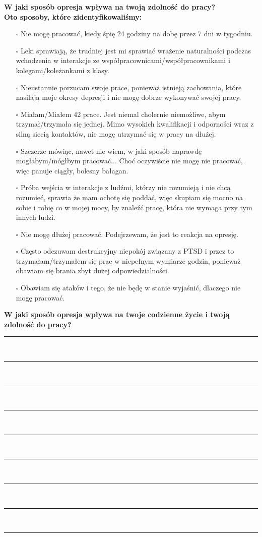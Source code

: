 \noindent\textcolor{ProcessBlue}{\textbf{\Large{W jaki sposób opresja wpływa na twoją zdolność do pracy?}}}\\
\textbf{\large{Oto sposoby, które zidentyfikowaliśmy:}}
\begin{multicols}{2}
\begin{itemize}
\item[$\square$]{Nie mogę pracować, kiedy śpię 24 godziny na dobę przez 7 dni w tygodniu.}
\item[$\square$]{Leki sprawiają, że trudniej jest mi sprawiać wrażenie naturalności podczas wchodzenia w interakcje ze współpracownicami/współpracownikami i kolegami/koleżankami z klasy.}
\item[$\square$]{Nieustannie porzucam swoje prace, ponieważ istnieją zachowania, które nasilają moje okresy depresji i nie mogę dobrze wykonywać swojej pracy.}
\item[$\square$]{Miałam/Miałem 42 prace. Jest niemal cholernie niemożliwe, abym trzymał/trzymała się jednej. Mimo wysokich kwalifikacji i odporności wraz z silną siecią kontaktów, nie mogę utrzymać się w pracy na dłużej.}
\item[$\square$]{Szczerze mówiąc, nawet nie wiem, w jaki sposób naprawdę mogłabym/mógłbym pracować... Choć oczywiście nie mogę nie pracować, więc panuje ciągły, bolesny bałagan.}
\item[$\square$]{Próba wejścia w interakcje z ludźmi, którzy nie rozumieją i nie chcą rozumieć, sprawia że mam ochotę się poddać, więc skupiam się mocno na sobie i robię co w mojej mocy, by znaleźć pracę, która nie wymaga przy tym innych ludzi.}
\item[$\square$]{Nie mogę dłużej pracować. Podejrzewam, że jest to reakcja na opresję.}
\item[$\square$]{Często odczuwam destrukcyjny niepokój związany z PTSD i przez to trzymałam/trzymałem się prac w niepełnym wymiarze godzin, ponieważ obawiam się brania zbyt dużej odpowiedzialności.}
\item[$\square$]{Obawiam się ataków i tego, że nie będę w stanie wyjaśnić, dlaczego nie mogę pracować.}
\end{itemize}
\end{multicols}


\newpage
\noindent
\textcolor{ProcessBlue}{\textbf{\Large{W jaki sposób opresja wpływa na twoje codzienne życie i twoją zdolność do pracy?}}}\\
\noindent\rule{\textwidth}{1pt}\\
\noindent\rule{\textwidth}{1pt}\\
\noindent\rule{\textwidth}{1pt}\\
\noindent\rule{\textwidth}{1pt}\\
\noindent\rule{\textwidth}{1pt}\\
\noindent\rule{\textwidth}{1pt}\\
\noindent\rule{\textwidth}{1pt}\\
\noindent\rule{\textwidth}{1pt}\\
\noindent\rule{\textwidth}{1pt}\\\\

